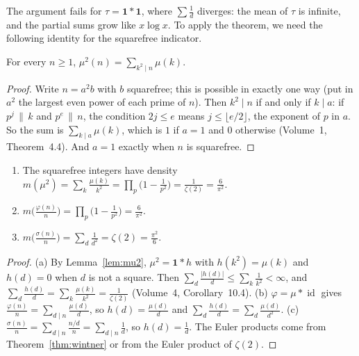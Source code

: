 The argument fails for $\tau=\mathbf1*\mathbf1$, where $\sum\frac1d$ diverges: the mean of $\tau$ is infinite, and the partial sums grow
like $x\log x$. To apply the theorem, we need the following identity for the squarefree indicator.

\begin{lemma}\label{lem:mu2}
For every $n\ge1$, $\mu^2(n)=\sum_{k^2\mid n}\mu(k)$.
\end{lemma}
\begin{proof}
Write $n=a^2b$ with $b$ squarefree; this is possible in exactly one way (put in $a^2$ the largest even power of each prime of $n$).
Then $k^2\mid n$ if and only if $k\mid a$: if $p^j\,\|\,k$ and $p^e\,\|\,n$, the condition $2j\le e$ means $j\le\lfloor e/2\rfloor$, the exponent of $p$
in $a$. So the sum is $\sum_{k\mid a}\mu(k)$, which is $1$ if $a=1$ and $0$ otherwise (Volume~1, Theorem~4.4). And $a=1$ exactly when
$n$ is squarefree.
\end{proof}

\begin{corollary}\label{cor:means}
\begin{enumerate}[label=(\alph*)]
\item The squarefree integers have density $m(\mu^2)=\sum_k\frac{\mu(k)}{k^2}=\prod_p\bigl(1-\frac1{p^2}\bigr)=\frac1{\zeta(2)}=\frac6{\pi^2}$.
\item $m\bigl(\frac{\varphi(n)}n\bigr)=\prod_p\bigl(1-\frac1{p^2}\bigr)=\frac6{\pi^2}$.
\item $m\bigl(\frac{\sigma(n)}n\bigr)=\sum_d\frac1{d^2}=\zeta(2)=\frac{\pi^2}6$.
\end{enumerate}
\end{corollary}
\begin{proof}
(a) By Lemma~\ref{lem:mu2}, $\mu^2=\mathbf1*h$ with $h(k^2)=\mu(k)$ and $h(d)=0$ when $d$ is not a square. Then
$\sum_d\frac{|h(d)|}d\le\sum_k\frac1{k^2}<\infty$, and $\sum_d\frac{h(d)}d=\sum_k\frac{\mu(k)}{k^2}=\frac1{\zeta(2)}$ (Volume~4, Corollary~10.4).
(b) $\varphi=\mu*\operatorname{id}$ gives $\frac{\varphi(n)}n=\sum_{d\mid n}\frac{\mu(d)}d$, so $h(d)=\frac{\mu(d)}d$ and $\sum_d\frac{h(d)}d=\sum_d\frac{\mu(d)}{d^2}$.
(c) $\frac{\sigma(n)}n=\sum_{d\mid n}\frac{n/d}n=\sum_{d\mid n}\frac1d$, so $h(d)=\frac1d$.
The Euler products come from Theorem~\ref{thm:wintner} or from the Euler product of $\zeta(2)$.
\end{proof}


